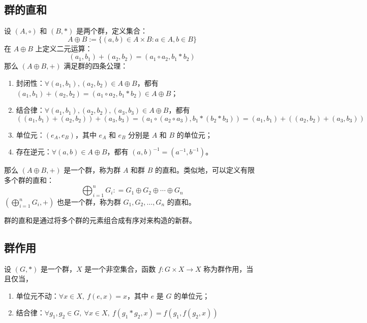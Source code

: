 \subsection{群的直和}
\begin{definition}
    设 $(A,\circ)$ 和 $(B,*)$ 是两个群，定义集合：
    \[
        A \oplus B := \{(a,b)\in A\times B:a\in A, b\in B\}
    \]
    在 $A \oplus B$ 上定义二元运算：
    \[
        (a_1,b_1) + (a_2,b_2) = (a_1 \circ a_2, b_1 * b_2)
    \]
    那么 $(A \oplus B, +)$ 满足群的四条公理：
    \begin{enumerate}
        \item 封闭性：$\forall (a_1,b_1), (a_2,b_2)\in A \oplus B$，都有 $(a_1,b_1) + (a_2,b_2) = (a_1 \circ a_2, b_1 * b_2) \in A \oplus B$；
        \item 结合律：$\forall (a_1,b_1), (a_2,b_2), (a_3,b_3)\in A \oplus B$，都有 
        \[
            ((a_1,b_1)  + (a_2,b_2)) + (a_3,b_3) = (a_1 \circ (a_2 \circ a_3), b_1 * (b_2 * b_3)) = (a_1,b_1) + ((a_2,b_2) + (a_3,b_3))
        \]
        \item 单位元：$(e_A, e_B)$，其中 $e_A$ 和 $e_B$ 分别是 $A$ 和 $B$ 的单位元；
        \item 存在逆元：$\forall (a,b)\in A \oplus B$，都有 $(a,b)^{-1} = (a^{-1}, b^{-1})$。
    \end{enumerate}
    那么 $(A \oplus B, +)$ 是一个群，称为群 $A$ 和群 $B$ 的直和。类似地，可以定义有限多个群的直和：
    \[
        \bigoplus^n_{i=1}G_i : = G_1\oplus G_2\oplus\cdots \oplus G_n
    \]
    $(\bigoplus^n_{i=1}G_i, +)$ 也是一个群，称为群 $G_1, G_2, \ldots, G_n$ 的直和。
    \label{def:group_direct_sum}
\end{definition}


\begin{note}
    群的直和是通过将多个群的元素组合成有序对来构造的新群。
\end{note}

\vspace{1em}

\subsection{群作用}
\begin{definition}
    设 $(G, *)$ 是一个群，$X$ 是一个非空集合，函数 $f:G\times X\to X$ 称为群作用，当且仅当，
    \begin{enumerate}
        \item 单位元不动：$\forall x\in X,\ f(e,x) = x$，其中 $e$ 是 $G$ 的单位元；
        \item 结合律：$\forall g_1, g_2\in G,\ \forall x\in X,\ f(g_1 * g_2, x) = f(g_1, f(g_2, x))$
    \end{enumerate}
    \label{def:group_action}
\end{definition}

